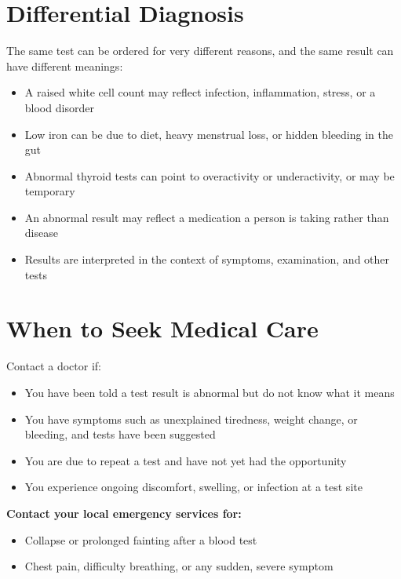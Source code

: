 \section*{Differential Diagnosis}
The same test can be ordered for very different reasons, and the same result can have different meanings:

\begin{itemize}
    \item A raised white cell count may reflect infection, inflammation, stress, or a blood disorder
    \item Low iron can be due to diet, heavy menstrual loss, or hidden bleeding in the gut
    \item Abnormal thyroid tests can point to overactivity or underactivity, or may be temporary
    \item An abnormal result may reflect a medication a person is taking rather than disease
    \item Results are interpreted in the context of symptoms, examination, and other tests
\end{itemize}

\section*{When to Seek Medical Care}
Contact a doctor if:

\begin{itemize}
    \item You have been told a test result is abnormal but do not know what it means
    \item You have symptoms such as unexplained tiredness, weight change, or bleeding, and tests have been suggested
    \item You are due to repeat a test and have not yet had the opportunity
    \item You experience ongoing discomfort, swelling, or infection at a test site
\end{itemize}

\textbf{Contact your local emergency services for:}
\begin{itemize}
    \item Collapse or prolonged fainting after a blood test
    \item Chest pain, difficulty breathing, or any sudden, severe symptom
\end{itemize}

